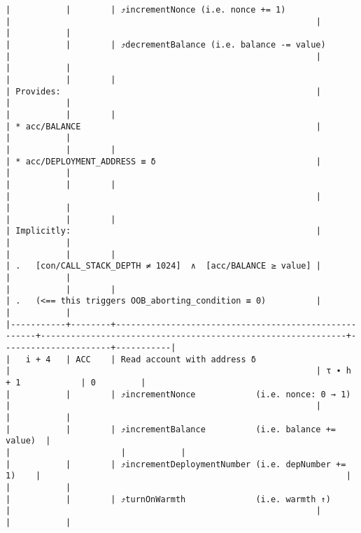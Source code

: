 \documentclass[varwidth=\maxdimen,margin=0.5cm,multi={verbatim}]{standalone}
\begin{document}
\begin{verbatim}
|           |        | ⤴️incrementNonce (i.e. nonce += 1)                   |                                                             |                      |           |
|           |        | ⤴️decrementBalance (i.e. balance -= value)           |                                                             |                      |           |
|           |        |                                                      | Provides:                                                   |                      |           |
|           |        |                                                      | * acc/BALANCE                                               |                      |           |
|           |        |                                                      | * acc/DEPLOYMENT_ADDRESS ≡ δ                                |                      |           |
|           |        |                                                      |                                                             |                      |           |
|           |        |                                                      | Implicitly:                                                 |                      |           |
|           |        |                                                      | .   [con/CALL_STACK_DEPTH ≠ 1024]  ∧  [acc/BALANCE ≥ value] |                      |           |
|           |        |                                                      | .   (<== this triggers OOB_aborting_condition ≡ 0)          |                      |           |
|-----------+--------+------------------------------------------------------+-------------------------------------------------------------+----------------------+-----------|
|   i + 4   | ACC    | Read account with address δ                          |                                                             | τ ∙ h + 1            | 0         |
|           |        | ⤴️incrementNonce            (i.e. nonce: 0 → 1)      |                                                             |                      |           |
|           |        | ⤴️incrementBalance          (i.e. balance += value)  |                                                             |                      |           |
|           |        | ⤴️incrementDeploymentNumber (i.e. depNumber += 1)    |                                                             |                      |           |
|           |        | ⤴️turnOnWarmth              (i.e. warmth ↑)          |                                                             |                      |           |

\end{verbatim}
\end{document}
